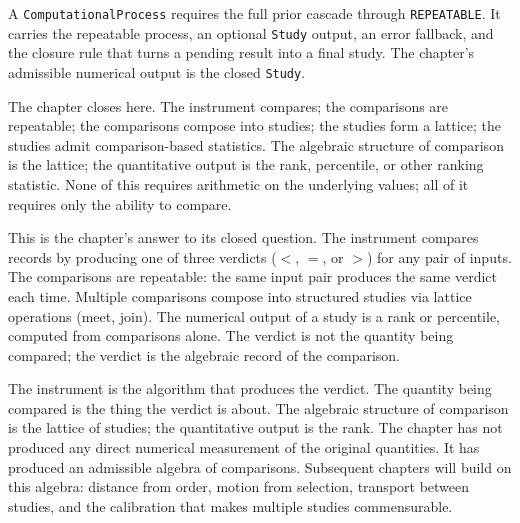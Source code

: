 A \texttt{ComputationalProcess} requires the full prior cascade
through \texttt{REPEATABLE}. It carries the repeatable process, an
optional \texttt{Study} output, an error fallback, and the closure
rule that turns a pending result into a final study. The chapter's
admissible numerical output is the closed \texttt{Study}.

The chapter closes here. The instrument compares; the comparisons
are repeatable; the comparisons compose into studies; the studies
form a lattice; the studies admit comparison-based statistics. The
algebraic structure of comparison is the lattice; the
quantitative output is the rank, percentile, or other ranking
statistic. None of this requires arithmetic on the underlying
values; all of it requires only the ability to compare.

This is the chapter's answer to its closed question. The instrument
compares records by producing one of three verdicts ($<$, $=$, or
$>$) for any pair of inputs. The comparisons are repeatable: the
same input pair produces the same verdict each time. Multiple
comparisons compose into structured studies via lattice operations
(meet, join). The numerical output of a study is a rank or
percentile, computed from comparisons alone. The verdict is not the
quantity being compared; the verdict is the algebraic record of the
comparison.

The instrument is the algorithm that produces the verdict. The
quantity being compared is the thing the verdict is about. The
algebraic structure of comparison is the lattice of studies; the
quantitative output is the rank. The chapter has not produced any
direct numerical measurement of the original quantities. It has
produced an admissible algebra of comparisons. Subsequent chapters
will build on this algebra: distance from order, motion from
selection, transport between studies, and the calibration that
makes multiple studies commensurable.

